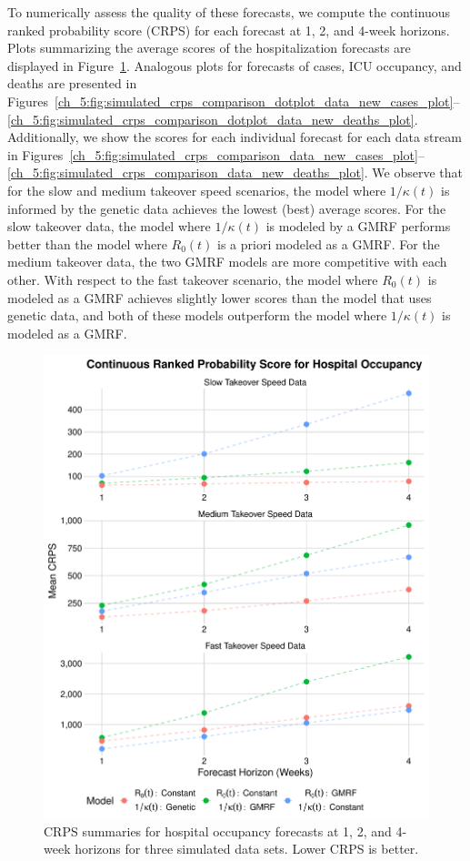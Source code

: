 To numerically assess the quality of these forecasts, we compute the continuous ranked probability score (CRPS) for each forecast at 1, 2, and 4-week horizons.
Plots summarizing the average scores of the hospitalization forecasts are displayed in Figure~\ref{ch_5:fig:simulated_crps_comparison_dotplot_data_hospitalizations_plot}.
Analogous plots for forecasts of cases, ICU occupancy, and deaths are presented in Figures~\ref{ch_5:fig:simulated_crps_comparison_dotplot_data_new_cases_plot}--\ref{ch_5:fig:simulated_crps_comparison_dotplot_data_new_deaths_plot}.
Additionally, we show the scores for each individual forecast for each data stream in Figures~\ref{ch_5:fig:simulated_crps_comparison_data_new_cases_plot}--\ref{ch_5:fig:simulated_crps_comparison_data_new_deaths_plot}.
We observe that for the slow and medium takeover speed scenarios, the model where \( 1 / \kappa(t) \) is informed by the genetic data achieves the lowest (best) average scores.
For the slow takeover data, the model where \( 1 / \kappa(t) \) is modeled by a GMRF performs better than the model where \( R_0(t) \) is a priori modeled as a GMRF.
For the medium takeover data, the two GMRF models are more competitive with each other.
With respect to the fast takeover scenario, the model where \( R_0(t) \) is modeled as a GMRF achieves slightly lower scores than the model that uses genetic data, and both of these models outperform the model where  \( 1 / \kappa(t) \) is modeled as a GMRF.

\begin{figure}
    \centering
    \includegraphics[width=0.75\columnwidth]{simulated_crps_comparison_dotplot_data_hospitalizations_plot}
    \caption[CRPS summaries for hospital occupancy forecasts for simulated data sets.]{CRPS summaries for hospital occupancy forecasts at 1, 2, and 4-week horizons for three simulated data sets. Lower CRPS is better.}
    \label{ch_5:fig:simulated_crps_comparison_dotplot_data_hospitalizations_plot}
\end{figure}


